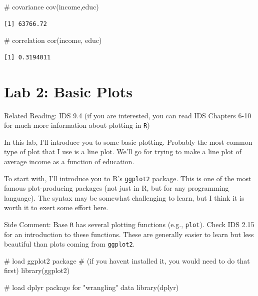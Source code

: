 \documentclass[
  letterpaper,
  DIV=11,
  numbers=noendperiod]{scrreprt}
\newenvironment{Shaded}{\begin{snugshade}}{\end{snugshade}}
\newcommand{\CommentTok}[1]{\textcolor[rgb]{0.37,0.37,0.37}{#1}}
\newcommand{\FunctionTok}[1]{\textcolor[rgb]{0.28,0.35,0.67}{#1}}
\newcommand{\NormalTok}[1]{\textcolor[rgb]{0.00,0.23,0.31}{#1}}
\begin{document}
\begin{Shaded}
\begin{Highlighting}[]
\CommentTok{\# covariance}
\FunctionTok{cov}\NormalTok{(income,educ)}
\end{Highlighting}
\end{Shaded}

\begin{verbatim}
[1] 63766.72
\end{verbatim}

\begin{Shaded}
\begin{Highlighting}[]
\CommentTok{\# correlation}
\FunctionTok{cor}\NormalTok{(income, educ)}
\end{Highlighting}
\end{Shaded}

\begin{verbatim}
[1] 0.3194011
\end{verbatim}

\section{Lab 2: Basic Plots}\label{lab-2-basic-plots}

Related Reading: IDS 9.4 (if you are interested, you can read IDS
Chapters 6-10 for much more information about plotting in \texttt{R})

In this lab, I'll introduce you to some basic plotting. Probably the
most common type of plot that I use is a line plot. We'll go for trying
to make a line plot of average income as a function of education.

To start with, I'll introduce you to R's \texttt{ggplot2} package. This
is one of the most famous plot-producing packages (not just in R, but
for any programming language). The syntax may be somewhat challenging to
learn, but I think it is worth it to exert some effort here.

{Side Comment:} Base \texttt{R} has several plotting functions (e.g.,
\texttt{plot}). Check IDS 2.15 for an introduction to these functions.
These are generally easier to learn but less beautiful than plots coming
from \texttt{ggplot2}.

\begin{Shaded}
\begin{Highlighting}[]
\CommentTok{\# load ggplot2 package}
\CommentTok{\# (if you haven\textquotesingle{}t installed it, you would need to do that first)}
\FunctionTok{library}\NormalTok{(ggplot2)}

\CommentTok{\# load dplyr package for "wrangling" data}
\FunctionTok{library}\NormalTok{(dplyr)}
\end{Highlighting}
\end{Shaded}
\end{document}

